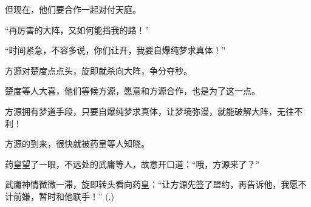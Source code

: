 \begin{this_body}
但现在，他们要合作一起对付天庭。

“再厉害的大阵，又如何能挡我的路！”

“时间紧急，不容多说，你们让开，我要自爆纯梦求真体！”

方源对楚度点点头，旋即就杀向大阵，争分夺秒。

楚度等人大喜，他们等候方源，愿意和方源合作，也是为了这一点。

方源拥有梦道手段，只要自爆纯梦求真体，让梦境弥漫，就能破解大阵，无往不利！

方源的到来，很快就被药皇等人知晓。

药皇望了一眼，不远处的武庸等人，故意开口道：“哦，方源来了？”

武庸神情微微一滞，旋即转头看向药皇：“让方源先签了盟约，再告诉他，我愿不计前嫌，暂时和他联手！”	 (.)

\end{this_body}

